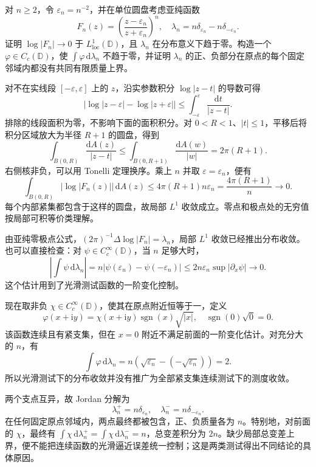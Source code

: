 \begin{exercise}[零极点相消与测试函数]\label{b3:ex:18-draft-06}
对 \(n\ge2\)，令 \(\varepsilon_n=n^{-2}\)，并在单位圆盘考虑亚纯函数
\[
 F_n(z)=\left(\frac{z-\varepsilon_n}{z+\varepsilon_n}\right)^n,
 \quad
 \lambda_n=n\delta_{\varepsilon_n}-n\delta_{-\varepsilon_n}.
\]
证明 \(\log|F_n|\to0\) 于 \(L^1_{\mathrm{loc}}(\mathbb D)\)，且 \(\lambda_n\) 在分布意义下趋于零。构造一个 \(\varphi\in C_c(\mathbb D)\)，使 \(\int\varphi\,\mathrm d\lambda_n\) 不趋于零，并证明 \(\lambda_n\) 的正、负部分在原点的每个固定邻域内都没有共同有限质量上界。
\end{exercise}
\begin{solution}
对不在实线段 \([-\varepsilon,\varepsilon]\) 上的 \(z\)，沿实参数积分 \(\log|z-t|\) 的导数可得
\[
 \bigl|\log|z-\varepsilon|-\log|z+\varepsilon|\bigr|
 \le\int_{-\varepsilon}^{\varepsilon}\frac{\mathrm dt}{|z-t|}.
\]
排除的线段面积为零，不影响下面的面积积分。对 \(0<R<1\)、\(|t|\le1\)，平移后将积分区域放大为半径 \(R+1\) 的圆盘，得到
\[
 \int_{B(0,R)}\frac{\mathrm dA(z)}{|z-t|}
 \le\int_{B(0,R+1)}\frac{\mathrm dA(w)}{|w|}
 =2\pi(R+1).
\]
右侧核非负，可以用 Tonelli 定理换序。乘上 \(n\) 并取 \(\varepsilon=\varepsilon_n\)，便有
\[
 \int_{B(0,R)}|\log|F_n(z)||\,\mathrm dA(z)
 \le4\pi(R+1)n\varepsilon_n
 =\frac{4\pi(R+1)}n\longrightarrow0.
\]
每个内部紧集都包含于这样的圆盘，故局部 \(L^1\) 收敛成立。零点和极点处的无穷值按局部可积等价类理解。

由亚纯零极点公式，\((2\pi)^{-1}\Delta\log|F_n|=\lambda_n\)，局部 \(L^1\) 收敛已经推出分布收敛。也可以直接检查：对 \(\psi\in C_c^\infty(\mathbb D)\)，当 \(n\) 足够大时，
\[
 \left|\int\psi\,\mathrm d\lambda_n\right|
 =n|\psi(\varepsilon_n)-\psi(-\varepsilon_n)|
 \le2n\varepsilon_n\sup|\partial_x\psi|
 \longrightarrow0.
\]
这个估计用到了光滑测试函数的一阶变化控制。

现在取非负 \(\chi\in C_c^\infty(\mathbb D)\)，使其在原点附近恒等于一，定义
\[
 \varphi(x+\mathrm iy)=\chi(x+\mathrm iy)\operatorname{sgn}(x)\sqrt{|x|},
 \quad \operatorname{sgn}(0)\sqrt0=0.
\]
该函数连续且有紧支集，但在 \(x=0\) 附近不满足前面的一阶变化估计。对充分大的 \(n\)，有
\[
 \int\varphi\,\mathrm d\lambda_n
 =n\left(\sqrt{\varepsilon_n}-(-\sqrt{\varepsilon_n})\right)=2.
\]
所以光滑测试下的分布收敛并没有推广为全部紧支集连续测试下的测度收敛。

两个支点互异，故 Jordan 分解为
\[
 \lambda_n^+=n\delta_{\varepsilon_n},\quad
 \lambda_n^-=n\delta_{-\varepsilon_n}.
\]
在任何固定原点邻域内，两点最终都被包含，正、负质量各为 \(n\)。特别地，对前面的 \(\chi\)，最终有
\(\int\chi\,\mathrm d\lambda_n^+=\int\chi\,\mathrm d\lambda_n^-=n\)，总变差积分为 \(2n\)。缺少局部总变差上界，便不能把连续函数的光滑逼近误差统一控制；这是两类测试得出不同结论的具体原因。
\end{solution}

